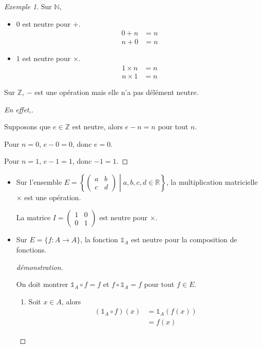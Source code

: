 \documentclass{report}
\theoremstyle{definition}
\theoremstyle{remark}
\newtheorem*{exem}{Exemple}
\begin{document}
	\begin{exem}
		Sur $\mathbb{N}$,

		\begin{itemize}
			\item $0$ est neutre pour $+$.
			\begin{align*}
				0+n&=n\\
				n+0&=n
			\end{align*}
			\item $1$ est neutre pour $\times$.
			\begin{align*}
				1 \times n&=n\\
				n \times 1&=n
			\end{align*}
		\end{itemize}

		Sur $\mathbb{Z}$, $-$ est une op\'eration mais elle n'a pas d\'el\'ement neutre.
		\renewcommand{\qedsymbol}{\lightning}
		\begin{proof}[En effet,]~

			Supposons que $e \in \mathbb{Z}$ est neutre, alors $e-n=n$ pour tout $n$.

			Pour $n=0$, $e-0=0$, donc $e=0$.

			Pour $n=1$, $e-1=1$, donc $-1=1$.
		\end{proof}
		\renewcommand{\qedsymbol}{$\square$}
		\begin{itemize}
			\item Sur l'ensemble $E=\left\lbrace \left( \begin{array}{cc}
				a&b\\c&d
			\end{array}\right) \middle| a,b,c,d \in \mathbb{R}\right\rbrace$, la multiplication matricielle $\times$ est une op\'eration.

			La matrice $I=\left( \begin{array}{cc}
				1&0\\0&1
			\end{array}\right)$ est neutre pour $\times$.
			\item Sur $E=\{f:A \to A\}$, la fonction $\mathds{1}_A$ est neutre pour la composition de fonctions.
			\begin{proof}[d\'emonstration]~

				On doit montrer $\mathds{1}_A \circ f=f$ et $f \circ \mathds{1}_A=f$ pour tout $f \in E$.
				\begin{enumerate}[label=(\arabic*)]
					\item Soit $x \in A$, alors
					\begin{align*}
						(\mathds{1}_A \circ f)(x)&= \mathds{1}_A(f(x))\\
						&= f(x)
					\end{align*}


\end{enumerate}
\end{proof}
\end{itemize}
\end{exem}
\end{document}
